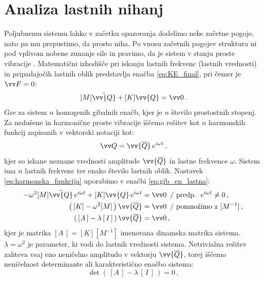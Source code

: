         
    \newpage
    \section{Analiza lastnih nihanj}\label{sec: AnalizaLastNihanj}
        Poljubnemu sistemu lahko v začetku opazovanja dodelimo neke začetne pogoje, nato pa mu prepustimo, da prosto niha. Po vnosu začetnih pogojev struktura ni pod vplivom nobene zunanje sile in pravimo, da je sistem v stanju proste vibracije  \cite{boltezar2010mehanska}.
        Matematični izhodišče pri iskanju lastnih frekvenc (lastnih vrednosti) in pripadajočih lastnih oblik predstavlja enačba \eqref{eq:KE_final}, pri čemer je $\vv F=0$:
        \begin{equation}\label{eq:gib_en_lastna}
            [M] \ddot{\vv{Q}}+[K] \vv{Q}=\vv 0\,.
        \end{equation}
        Gre za sistem $n$ homogenih gibalnih enačb, kjer je $n$ število prostostnih stopenj. Za nedušene in harmonične proste vibracije iščemo rešitev kot $n$ harmonskih funkcij zapisanih v vektorski notaciji kot:
        \begin{equation} \label{eq:harmonska_funkcija}
            \vv Q= \vv{\overline{Q}} \, e^{i \omega t} \,,
        \end{equation}
        kjer so iskane neznane vrednosti amplitude $\vv{\overline{Q}}$ in lastne frekvence $\omega$. Sistem ima $n$ lastnih frekvenc ter enako število lastnih oblik.
        Nastavek \eqref{eq:harmonska_funkcija} uporabimo v enačbi \eqref{eq:gib_en_lastna}:
        \begin{align}\label{eq:karakteristica_en}
            -\omega^2 [M]\ddot{\vv{Q}} \, e^{i \omega t}+[K]\vv{Q} \,e^{i \omega t}&=\vv 0 \, \textrm{ / predp. } \,e^{i \omega t} \neq 0\nonumber \,, \\
            \left(\,[K]-\omega^2[M] \, \right) \vv{\overline{Q}}&=\vv 0 \, \textrm{ / pomnožimo z }[M^{-1}]\nonumber \,, \\
            \left(\,[A\,]-\lambda \, [\,I\,] \, \right) \vv{\overline{Q}}&=\vv 0 \,,
        \end{align}
        kjer je matrika $[A\,]=[K][M^{-1}]$ imenovana dinamska matrika sistema. $\lambda=\omega^2$ je parameter, ki vodi do lastnih vrednosti sistema. Netrivialna rešitev zahteva vsaj eno neničelno amplitudo v vektorju $\vv{\overline{Q}}$, torej iščemo neničelnost determinante ali karakteristično enačbo sistema:
        \begin{equation}
            \det \left( \, [A\,]-\lambda \, [\,I\,] \, \right)=0 \,,
        \end{equation}
